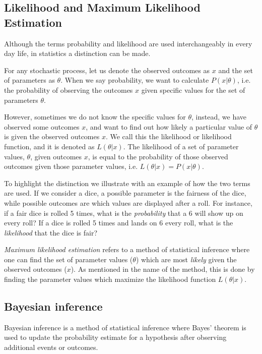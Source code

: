 \subsection{Likelihood and Maximum Likelihood Estimation}
\label{subsec:likelihood-and-mle}
Although the terms probability and likelihood are used interchangeably in every day life, in statistics a distinction can be made.\newline

For any stochastic process, let us denote the observed outcomes as $x$ and the set of parameters as $\theta$. When we say probability, we want to calculate $P(x | \theta)$, i.e. the probability of observing the outcomes $x$ given specific values for the set of parameters $\theta$. \newline

However, sometimes we do not know the specific values for $\theta$, instead, we have observed some outcomes $x$, and want to find out how likely a particular value of $\theta$ is given the observed outcomes $x$. We call this the likelihood or likelihood function, and it is denoted as $L(\theta | x)$. The likelihood of a set of parameter values, $\theta$, given outcomes $x$, is equal to the probability of those observed outcomes given those parameter values, i.e. $L(\theta | x) = P(x | \theta)$.\newline

To highlight the distinction we illustrate with an example of how the two terms are used. If we consider a dice, a possible parameter is the fairness of the dice, while possible outcomes are which values are displayed after a roll. For instance, if a fair dice is rolled 5 times, what is the \textit{probability} that a 6 will show up on every roll? If a dice is rolled 5 times and lands on 6 every roll, what is the \textit{likelihood} that the dice is fair? \newline

\textit{Maximum likelihood estimation} refers to a method of statistical inference where one can find the set of parameter values ($\theta$) which are most \textit{likely} given the observed outcomes ($x$). As mentioned in the name of the method, this is done by finding the parameter values which maximize the likelihood function $L(\theta | x)$.

\subsection{Bayesian inference}
\label{subsec:bayesian-inference}
Bayesian inference is a method of statistical inference where Bayes' theorem is used to update the probability estimate for a hypothesis after observing additional events or outcomes.

